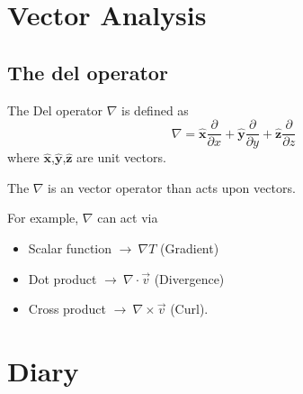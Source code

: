 \documentclass[11pt,a4paper,fleqn]{article}
\numberwithin{equation}{section}
\newcommand{\go}{$\rightarrow\ $}
\newcommand{\Del}{\ensuremath{\nabla}}
\newcommand{\UnitVec}[1]{\ensuremath{\boldsymbol{\hat{#1}}}} %
\begin{document}
\section{Vector Analysis}
\subsection{The del operator}

The Del operator $\Del$ is defined as
\begin{equation}
  \newcommand{\utp}[1]{\UnitVec{#1}\frac{\partial}{\partial #1}}
  \Del =\utp{x} + \utp{y} + \utp{z}
\end{equation}
where \UnitVec{x},\UnitVec{y},\UnitVec{z} are unit vectors.

The $\Del$ is an vector operator than acts upon vectors.

For example, $\Del$ can act via

\begin{itemize}
  \item Scalar function \go $\Del T$ (Gradient)
  \item Dot product \go $\Del\cdot\vec{v}$ (Divergence)
  \item Cross product \go $\Del \times \vec{v}$ (Curl).
\end{itemize}

\section{Diary}
\end{document}
